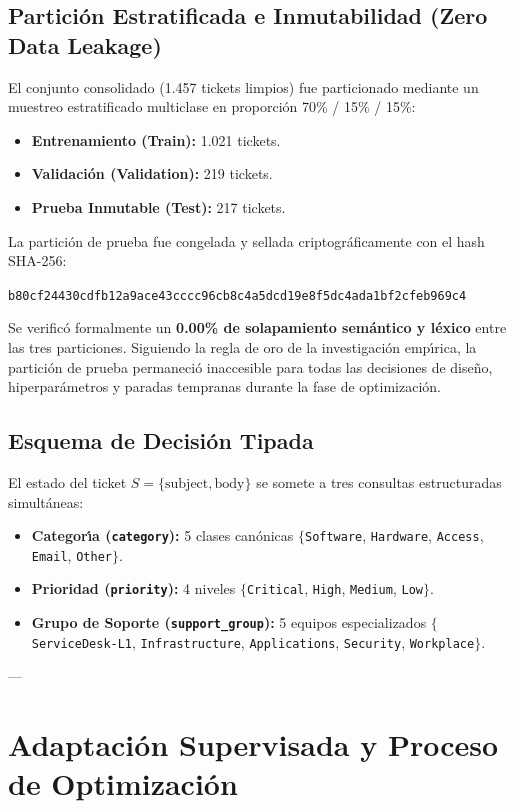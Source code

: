 \documentclass[10pt,journal,compsoc]{IEEEtran}
\begin{document}
\subsection{Partici\'on Estratificada e Inmutabilidad (Zero Data Leakage)}
El conjunto consolidado (1.457 tickets limpios) fue particionado mediante un muestreo estratificado multiclase en proporci\'on 70\% / 15\% / 15\%:
\begin{itemize}
    \item \textbf{Entrenamiento (Train):} 1.021 tickets.
    \item \textbf{Validaci\'on (Validation):} 219 tickets.
    \item \textbf{Prueba Inmutable (Test):} 217 tickets.
\end{itemize}
La partici\'on de prueba fue congelada y sellada criptogr\'aficamente con el hash SHA-256:
\begin{center}
\texttt{b80cf24430cdfb12a9ace43cccc96cb8c4a5dcd19e8f5dc4ada1bf2cfeb969c4}
\end{center}
Se verific\'o formalmente un \textbf{0.00\% de solapamiento sem\'antico y l\'exico} entre las tres particiones. Siguiendo la regla de oro de la investigaci\'on emp\'{\i}rica, la partici\'on de prueba permaneci\'o inaccesible para todas las decisiones de dise\~no, hiperpar\'ametros y paradas tempranas durante la fase de optimizaci\'on.

\subsection{Esquema de Decisi\'on Tipada}
El estado del ticket $S = \{\text{subject}, \text{body}\}$ se somete a tres consultas estructuradas simult\'aneas:
\begin{itemize}
    \item \textbf{Categor\'{\i}a (\texttt{category}):} 5 clases can\'onicas $\{$\texttt{Software}, \texttt{Hardware}, \texttt{Access}, \texttt{Email}, \texttt{Other}$\}$.
    \item \textbf{Prioridad (\texttt{priority}):} 4 niveles $\{$\texttt{Critical}, \texttt{High}, \texttt{Medium}, \texttt{Low}$\}$.
    \item \textbf{Grupo de Soporte (\texttt{support\_group}):} 5 equipos especializados $\{$\texttt{ServiceDesk-L1}, \texttt{Infrastructure}, \texttt{Applications}, \texttt{Security}, \texttt{Workplace}$\}$.
\end{itemize}

---

\section{Adaptaci\'on Supervisada y Proceso de Optimizaci\'on}
\end{document}
